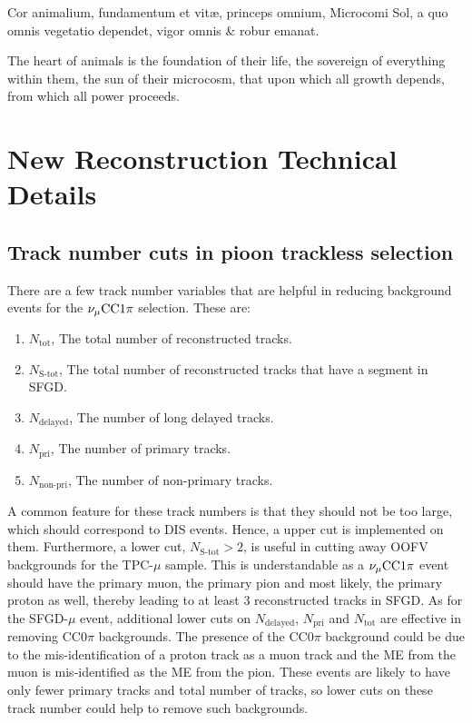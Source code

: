  \begin{savequote}[8cm]
\textlatin{Cor animalium, fundamentum e\longs t vitæ, princeps omnium, Microco\longs mi Sol, a quo omnis vegetatio dependet, vigor omnis \& robur emanat.}

The heart of animals is the foundation of their life, the sovereign of everything within them, the sun of their microcosm, that upon which all growth depends, from which all power proceeds.
\end{savequote}

\chapter{\label{app:newtech}New Reconstruction Technical Details}

\minitoc


\section{}



\section{Track number cuts in pioon trackless selection}
\label{sec:app-tlpi-trknumcut}
There are a few track number variables that are helpful in reducing background events for the $\nu_{\mu}\textrm{CC}1\pi$ selection. 
These are:
\begin{enumerate}
    \item $N_{\textrm{tot}}$, The total number of reconstructed tracks.
    \item $N_{\textrm{S-tot}}$, The total number of reconstructed tracks that have a segment in SFGD.
    \item $N_{\textrm{delayed}}$, The number of long delayed tracks.
    \item $N_{\textrm{pri}}$, The number of primary tracks.
    \item $N_{\textrm{non-pri}}$, The number of non-primary tracks.
\end{enumerate}
A common feature for these track numbers is that they should not be too large, which should correspond to DIS events.
Hence, a upper cut is implemented on them.
Furthermore, a lower cut, $N_{\textrm{S-tot}}>2$, is useful in cutting away OOFV backgrounds for the TPC-$\mu$ sample.
This is understandable as a $\nu_{\mu}\textrm{CC}1\pi$ event should have the primary muon, the primary pion and most likely, the primary proton as well, thereby leading to at least $3$ reconstructed tracks in SFGD.
As for the SFGD-$\mu$ event, additional lower cuts on  $N_{\textrm{delayed}}$, $N_{\textrm{pri}}$ and $N_{\textrm{tot}}$ are effective in removing CC$0\pi$ backgrounds.
The presence of the CC$0\pi$ background could be due to the mis-identification of a proton track as a muon track and the ME from the muon is mis-identified as the ME from the pion.
These events are likely to have only fewer primary tracks and total number of tracks, so lower cuts on these track number could help to remove such backgrounds.
